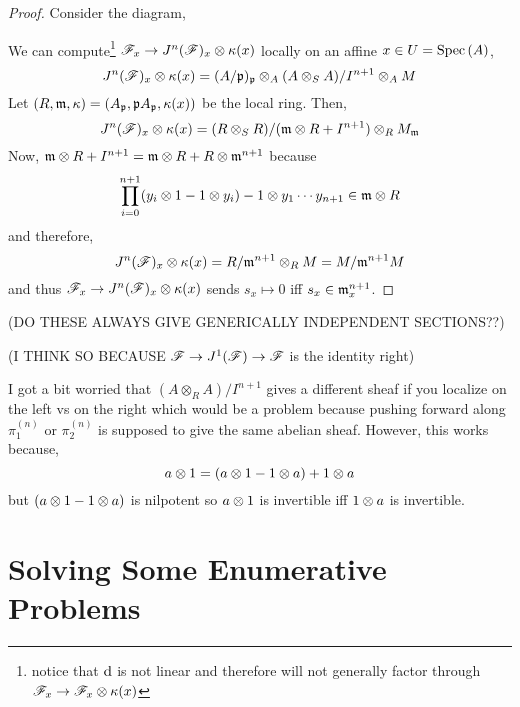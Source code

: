\documentclass[12pt]{article}
\begin{document}
\begin{proof}
Consider the diagram,
\begin{center}
\end{center}
We can compute\footnote{notice that $\mathrm{d}$ is not linear and therefore will not generally factor through $\mathscr{F}_x \to \mathscr{F}_x \otimes \kappa(x)$} $\mathscr{F}_x \to J^n(\mathscr{F})_x \otimes \kappa(x)$ locally on an affine $x \in U = \mathrm{Spec}\left( A \right)$,
\[ J^n(\mathscr{F})_x \otimes \kappa(x) = (A/\mathfrak{p})_{\mathfrak{p}} \otimes_A (A \otimes_S A)/I^{n+1} \otimes_A M \]
Let $(R, \mathfrak{m}, \kappa) = (A_{\mathfrak{p}}, \mathfrak{p} A_{\mathfrak{p}}, \kappa(x))$ be the local ring. Then,
\[ J^n(\mathscr{F})_x \otimes \kappa(x) = (R \otimes_S R)/(\mathfrak{m} \otimes R + I^{n+1}) \otimes_R M_{\mathfrak{m}} \]
Now, $\mathfrak{m} \otimes R + I^{n+1} = \mathfrak{m} \otimes R + R \otimes \mathfrak{m}^{n+1}$ because
\[  \prod_{i = 0}^{n+1} (y_i \otimes 1 - 1 \otimes y_i) - 1 \otimes y_1 \cdots y_{n+1} \in \mathfrak{m} \otimes R \]
and therefore,
\[ J^n(\mathscr{F})_x \otimes \kappa(x) = R/\mathfrak{m}^{n+1} \otimes_R M = M / \mathfrak{m}^{n+1} M \]
and thus $\mathscr{F}_x \to J^n(\mathscr{F})_x \otimes \kappa(x)$ sends $s_x \mapsto 0$ iff $s_x \in \mathfrak{m}_x^{n+1}$.
\end{proof}

(DO THESE ALWAYS GIVE GENERICALLY INDEPENDENT SECTIONS??)

(I THINK SO BECAUSE $\mathscr{F} \to J^1(\mathscr{F}) \to \mathscr{F}$ is the identity right)

\begin{rmk}
I got a bit worried that $(A \otimes_R A)/I^{n+1}$ gives a different sheaf if you localize on the left vs on the right which would be a problem because pushing forward along $\pi_1^{(n)}$ or $\pi_2^{(n)}$ is supposed to give the same abelian sheaf. However, this works because,
\[ a \otimes 1 = (a \otimes 1 - 1 \otimes a) + 1 \otimes a \]
but $(a \otimes 1 - 1 \otimes a)$ is nilpotent so $a \otimes 1$ is invertible iff $1 \otimes a$ is invertible. 
\end{rmk}

\section{Solving Some Enumerative Problems}
\end{document}
